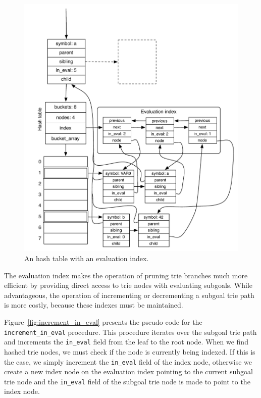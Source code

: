 \begin{figure}[ht]
  \centering
  \includegraphics[scale=0.6]{hash_table_evaluation_index.pdf}
  \caption{An hash table with an evaluation index.}
  \label{fig:hash_table_evaluation_index}
\end{figure}

The evaluation index makes the operation of pruning trie branches much
more efficient by providing direct access to trie nodes with
evaluating subgoals. While advantageous, the operation of incrementing
or decrementing a subgoal trie path is more costly, because these
indexes must be maintained.

Figure~\ref{fig:increment_in_eval} presents the pseudo-code for the
\texttt{increment\_in\_eval} procedure. This procedure iterates over the
subgoal trie path and increments the \texttt{in\_eval} field from the leaf to
the root node. When we find hashed trie nodes, we must check if the
node is currently being indexed. If this is the case, we simply
increment the \texttt{in\_eval} field of the index node, otherwise we create
a new index node on the evaluation index pointing to the current
subgoal trie node and the \texttt{in\_eval} field of the subgoal trie node is
made to point to the index node.

